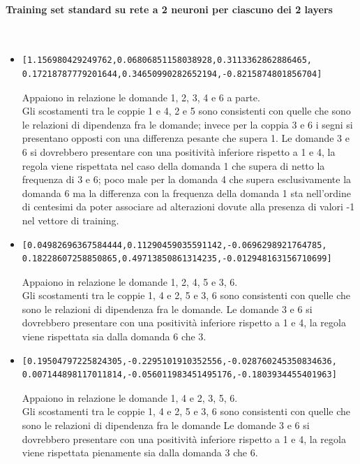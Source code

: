 \paragraph{Training set standard su rete a 2 neuroni per ciascuno dei 2 layers}\mbox{}
\label{Training set standard su rete a 2 neuroni per ciascuno dei 2 layers}
\\
\noindent
\begin{itemize}
\item \begin{verbatim}[1.156980429249762,0.06806851158038928,0.3113362862886465,
0.17218787779201644,0.34650990282652194,-0.8215874801856704]\end{verbatim}
Appaiono in relazione le domande 1, 2, 3, 4  e 6 a parte.\\
Gli scostamenti tra le coppie  1 e 4, 2 e 5 sono consistenti con quelle che sono le relazioni di dipendenza fra le domande; invece per la coppia 3 e 6 i segni si presentano opposti con una differenza pesante che supera 1.
Le domande 3 e 6 si dovrebbero presentare con una positivit\`a inferiore rispetto a 1 e 4, la regola viene rispettata nel caso della domanda 1 che supera di netto la frequenza di 3 e 6; poco male per la domanda 4 che supera esclusivamente la domanda 6 ma la differenza con la frequenza della domanda 1 sta nell'ordine di centesimi da poter associare ad alterazioni dovute alla presenza di valori -1 nel vettore di training.

\item \begin{verbatim}[0.04982696367584444,0.11290459035591142,-0.0696298921764785, 
0.18228607258850865,0.49713850861314235,-0.012948163156710699]\end{verbatim}
Appaiono in relazione le domande 1, 2, 4, 5 e 3, 6.\\
Gli scostamenti tra le coppie 1, 4 e 2, 5  e 3, 6 sono consistenti con quelle che sono le relazioni di dipendenza fra le domande.
Le domande 3 e 6 si dovrebbero presentare con una positivit\`a inferiore rispetto a 1 e 4, la regola viene rispettata sia dalla domanda 6 che 3.

\item \begin{verbatim}[0.19504797225824305,-0.2295101910352556,-0.028760245350834636,
0.007144898117011814,-0.056011983451495176,-0.1803934455401963]\end{verbatim}
Appaiono in relazione le domande 1, 4 e 2, 3, 5, 6.\\
Gli scostamenti tra le coppie 1, 4 e 2, 5 e 3, 6 sono consistenti con quelle che sono le relazioni di dipendenza fra le domande
Le domande 3 e 6 si dovrebbero presentare con una positivit\`a inferiore rispetto a 1 e 4, la regola viene rispettata pienamente sia dalla domanda 3 che 6.


\end{itemize}
